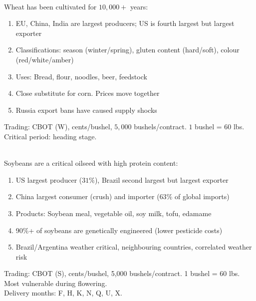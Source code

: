 \begin{remark} \\
Wheat has been cultivated for $10,000+$ years:
\begin{enumerate}[label=\roman*.]
\setlength{\itemsep}{0pt}
\item EU, China, India are largest producers; US is fourth largest but largest exporter
\item Classifications: season (winter/spring), gluten content (hard/soft), colour (red/white/amber)
\item Uses: Bread, flour, noodles, beer, feedstock
\item Close substitute for corn. Prices move together
\item Russia export bans have caused supply shocks
\end{enumerate}
Trading: CBOT (W), cents/bushel, $5,000$ bushels/contract. $1$ bushel = $60$ lbs.\\
Critical period: heading stage.
\end{remark}

\begin{remark} \\
Soybeans are a critical oilseed with high protein content:
\begin{enumerate}[label=\roman*.]
\setlength{\itemsep}{0pt}
\item US largest producer ($31\%$), Brazil second largest but largest exporter
\item China largest consumer (crush) and importer ($63\%$ of global imports)
\item Products: Soybean meal, vegetable oil, soy milk, tofu, edamame
\item 90\%+ of soybeans are genetically engineered (lower pesticide costs)
\item Brazil/Argentina weather critical, neighbouring countries, correlated weather risk
\end{enumerate}
Trading: CBOT (S), cents/bushel, 5,000 bushels/contract. 1 bushel = 60 lbs. Most vulnerable during flowering.\\
Delivery months: F, H, K, N, Q, U, X.
\end{remark}


